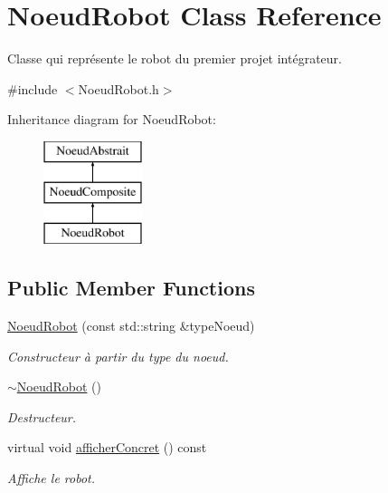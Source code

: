 \hypertarget{class_noeud_robot}{}\section{Noeud\+Robot Class Reference}
\label{class_noeud_robot}


Classe qui représente le robot du premier projet intégrateur.  




{\ttfamily \#include $<$Noeud\+Robot.\+h$>$}

Inheritance diagram for Noeud\+Robot\+:\begin{figure}[H]
\begin{center}
\leavevmode
\includegraphics[height=3.000000cm]{class_noeud_robot}
\end{center}
\end{figure}
\subsection*{Public Member Functions}
\begin{DoxyCompactItemize}
\item 
\hyperlink{group__inf2990_ga147453ac7f72970d7d9bfe336998ad94}{Noeud\+Robot} (const std\+::string \&type\+Noeud)
\begin{DoxyCompactList}\small\item\em Constructeur à partir du type du noeud. \end{DoxyCompactList}\item 
\hyperlink{group__inf2990_ga5649710d151f0548d8a7a279aad4c655}{$\sim$\+Noeud\+Robot} ()
\begin{DoxyCompactList}\small\item\em Destructeur. \end{DoxyCompactList}\item 
virtual void \hyperlink{group__inf2990_gad63a8e09cc5ca8cc349f35e0901474e2}{afficher\+Concret} () const 
\begin{DoxyCompactList}\small\item\em Affiche le robot. \end{DoxyCompactList}\end{DoxyCompactItemize}
